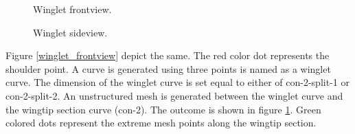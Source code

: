 \begin{figure}[!htbp]
\parbox{0.5\linewidth}{
    \centering
    \caption{Winglet frontview.}
    \label{winglet_frontview}
}
\parbox{0.5\linewidth}{
   \centering
    \caption{Winglet sideview.}
    \label{winglet_sideview}
}
\end{figure}
Figure \ref{winglet_frontview} depict the same. The red color dot represents the shoulder point. A curve is generated using three points is named as a winglet curve. The dimension of the winglet curve is set equal to either of con-2-split-1 or con-2-split-2. An unstructured mesh is generated between the winglet curve and the wingtip section curve (con-2). The outcome is shown in figure \ref{winglet_sideview}. Green colored dots represent the extreme mesh points along the wingtip section.  

